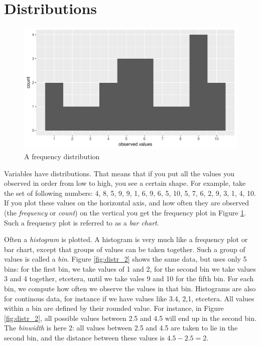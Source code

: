 \documentclass[]{report}\usepackage[]{graphicx}\usepackage[]{color}
\makeatletter
\def\maxwidth{ %
  \ifdim\Gin@nat@width>\linewidth
    \linewidth
  \else
    \Gin@nat@width
  \fi
}
\newenvironment{knitrout}{}{} %
\makeatother
\begin{document}
\section{Distributions}


\begin{knitrout}
\color{fgcolor}\begin{figure}

{\centering \includegraphics[width=\maxwidth]{figure/distr_1-1} 

}

\caption[A frequency distribution]{A frequency distribution}\label{fig:distr_1}
\end{figure}


\end{knitrout}

Variables have distributions. That means that if you put all the values you observed in order from low to high, you see a certain shape. For example, take the set of following numbers: 4, 8, 5, 9, 9, 1, 6, 9, 6, 5, 10, 5, 7, 6, 2, 9, 3, 1, 4, 10. If you plot these values on the horizontal axis, and how often they are observed (the \textit{frequency} or \textit{count}) on the vertical you get the frequency plot in Figure \ref{fig:distr_1}. Such a frequency plot is referred to as a \textit{bar chart}.

Often a \textit{histogram} is plotted. A histogram is very much like a frequency plot or bar chart, except that groups of values can be taken together. Such a group of values is called a \textit{bin}. Figure \ref{fig:distr_2} shows the same data, but uses only 5 bins: for the first bin, we take values of 1 and 2, for the second bin we take values 3 and 4 together, etcetera, until we take vales 9 and 10 for the fifth bin. For each bin, we compute how often we observe the values in that bin. Histograms are also for continous data, for instance if we have values like 3.4, 2,1, etcetera. All values within a bin are defined by their rounded value. For instance, in Figure \ref{fig:distr_2}, all possible values between 2.5 and 4.5 will end up in the second bin. The \textit{binwidth} is here 2: all values between 2.5 and 4.5 are taken to lie in the second bin, and the distance between these values is $4.5-2.5=2$. 
\end{document}
